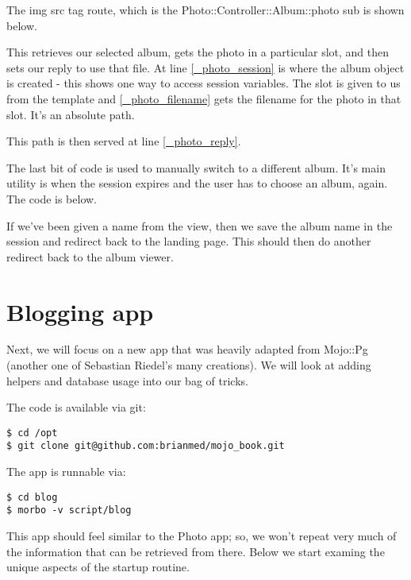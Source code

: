 \documentclass[14pt]{extreport}
\newcommand\Small{\fontsize{12}{13.0}\fontencoding{T1}\selectfont}
\newcommand*\LSTfont{\Small\ttfamily\SetTracking{encoding=*}{-60}\lsstyle}
\begin{document}
The img src tag route, which is the Photo::Controller::Album::photo sub is shown below.



This retrieves our selected album, gets the photo in a particular slot, and
then sets our reply to use that file. At line \ref{_photo_session} is where the
album object is created - this shows one way to access session variables. The slot
is given to us from the template and \ref{_photo_filename} gets the filename
for the photo in that slot.  It's an absolute path.

This path is then served at line \ref{_photo_reply}.

The last bit of code is used to manually switch to a different album. It's main utility
is when the session expires and the user has to choose an album, again.  The code is
below.



If we've been given a name from the view, then we save the album name in the session and
redirect back to the landing page.  This should then do another redirect back to the
album viewer.

\section{Blogging app}

Next, we will focus on a new app that was heavily adapted from Mojo::Pg
(another one of Sebastian Riedel's many creations).  We will look at adding
helpers and database usage into our bag of tricks.

The code is available via git:

\begin{lstlisting}[style=BashOutputStyle]
$ cd /opt
$ git clone git@github.com:brianmed/mojo_book.git
\end{lstlisting}

The app is runnable via:

\begin{lstlisting}[style=BashInputStyle]
$ cd blog
$ morbo -v script/blog
\end{lstlisting}

This app should feel similar to the Photo app; so, we won't repeat very much of
the information that can be retrieved from there.  Below we start examing the
unique aspects of the startup routine.
\end{document}
